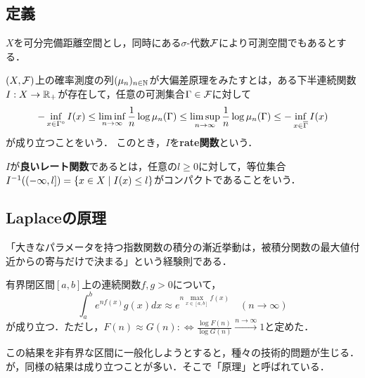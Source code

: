\documentclass[uplatex,dvipdfmx]{jsreport}
\begin{document}
\subsection{定義}

\begin{notation}
    $X$を可分完備距離空間とし，同時にある$\sigma$-代数$\mathcal{F}$により可測空間でもあるとする．
\end{notation}

\begin{definition}
    $(X,\mathcal{F})$上の確率測度の列$(\mu_n)_{n\in\mathbb{N}}$が大偏差原理をみたすとは，ある下半連続関数$I:X\to\mathbb{R}_+$が存在して，任意の可測集合$\Gamma\in\mathcal{F}$に対して
    \[-\inf_{x\in\Gamma^\circ}I(x)\le\liminf_{n\to\infty}\frac{1}{n}\log\mu_n(\Gamma)\le\limsup_{n\to\infty}\frac{1}{n}\log\mu_n(\Gamma)\le-\inf_{x\in\overline{\Gamma}}I(x)\]
    が成り立つことをいう．
    このとき，$I$を\textbf{rate関数}という．
\end{definition}

\begin{definition}
    $I$が\textbf{良いレート関数}であるとは，任意の$l\ge0$に対して，等位集合$I^{-1}((-\infty,l])=\left\{x\in X\mid I(x)\le l\right\}$がコンパクトであることをいう．
\end{definition}

\subsection{Laplaceの原理}

\begin{tcolorbox}[colframe=ForestGreen, colback=ForestGreen!10!white,breakable,colbacktitle=ForestGreen!40!white,coltitle=black,fonttitle=\bfseries\sffamily,
title=]
    「大きなパラメータを持つ指数関数の積分の漸近挙動は，被積分関数の最大値付近からの寄与だけで決まる」という経験則である．
\end{tcolorbox}

\begin{example}
    有界閉区間$[a,b]$上の連続関数$f,g>0$について，
    \[\int^b_ae^{nf(x)}g(x)dx\approx e^{n\max_{x\in[a,b]}f(x)}\quad(n\to\infty)\]
    が成り立つ．ただし，$F(n)\approx G(n):\Leftrightarrow\frac{\log F(n)}{\log G(n)}\xrightarrow{n\to\infty}1$と定めた．
\end{example}
\begin{remark}
    この結果を非有界な区間に一般化しようとすると，種々の技術的問題が生じる．
    が，同様の結果は成り立つことが多い．そこで「原理」と呼ばれている．
\end{remark}
\end{document}
